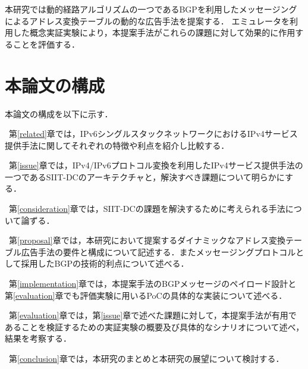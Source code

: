 本研究では動的経路アルゴリズムの一つであるBGP\cite{RFC4271}を利用したメッセージングによるアドレス変換テーブルの動的な広告手法を提案する．
エミュレータを利用した概念実証実験により，本提案手法がこれらの課題に対して効果的に作用することを評価する．



\section{本論文の構成}

本論文の構成を以下に示す．

~第\ref{related}章では，IPv6シングルスタックネットワークにおけるIPv4サービス提供手法に関してそれぞれの特徴や利点を紹介し比較する．

~第\ref{issue}章では，IPv4/IPv6プロトコル変換を利用したIPv4サービス提供手法の一つであるSIIT-DCのアーキテクチャと，解決すべき課題について明らかにする．

~第\ref{consideration}章では，SIIT-DCの課題を解決するために考えられる手法について論ずる．

~第\ref{proposal}章では，本研究において提案するダイナミックなアドレス変換テーブル広告手法の要件と構成について記述する．またメッセージングプロトコルとして採用したBGPの技術的利点について述べる．

~第\ref{implementation}章では，本提案手法のBGPメッセージのペイロード設計と第\ref{evaluation}章でも評価実験に用いるPoCの具体的な実装について述べる．

~第\ref{evaluation}章では，第\ref{issue}章で述べた課題に対して，本提案手法が有用であることを検証するための実証実験の概要及び具体的なシナリオについて述べ，結果を考察する．

~第\ref{conclusion}章では，本研究のまとめと本研究の展望について検討する．

